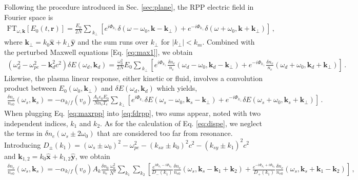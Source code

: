 \documentclass[
 reprint,
 superscriptaddress,
 amsmath,amssymb,
 aps,
]{revtex4-1}
\begin{document}
\begin{widetext}
Following the procedure introduced in Sec. \ref{sec:plane}, the RPP electric field in Fourier space is
\begin{align}
\mathrm{FT}_{\omega,\mathbf{k} }[E_0(t,\mathbf{r}) ]= \frac{E_0}{2N} \sum_{\ k_{\perp} }[ e^{i\Phi_{k_\perp}}\delta(\omega-\omega_0, \mathbf{k}-\mathbf{k}_\perp)    + e^{-i\Phi_{k_\perp}}\delta(\omega+\omega_0, \mathbf{k}+\mathbf{k}_\perp) ]
\, , \label{eq:erppf}
\end{align}
 where $\mathbf{k}_\perp= k_0\hat{\mathbf{x}} +k_\perp \hat{\mathbf{y}}$ and the sum runs over $k_\perp$ for $\vert k_\perp\vert  <k_m$.
 Combined with the perturbed Maxwell equations [Eq. \eqref{eq:max1}], we obtain
 \begin{align}
    (\omega_d^2 - \omega_{pe}^2 -\mathbf{k}_d^2c^2)\delta E(\omega_d,\mathbf{k}_d) = \frac{\omega_0^2}{2N} E_0 \sum_{\ k_{\perp} }   \left[e^{i\Phi_{k_\perp}}\frac{\delta n_e }{n_c}(\omega_d-\omega_0, \mathbf{k}_d-\mathbf{k}_\perp) +e^{-i\Phi_{k_\perp}}\frac{\delta n_e }{n_c}(\omega_d+\omega_0, \mathbf{k}_d+\mathbf{k}_\perp) \right] \, .\label{eq:maxrpp}
\end{align}
Likewise, the plasma linear response, either kinetic or fluid, involves a convolution product between $E_0(\omega_0,\mathbf{k}_\perp)$ and $\delta E(\omega_d,\mathbf{k}_d)$ which yields,
\begin{align}
   \frac{\delta n_e }{n_{e0}}(\omega_s,\mathbf{k}_s) = -\alpha_{k/f}(v_\phi) \frac{A_k\epsilon_0E_0}{Nn_c T_e} \sum_{\ k_{\perp} }     \left[e^{i\Phi_{k_\perp}}\delta E(\omega_s-\omega_0, \mathbf{k}_s-\mathbf{k}_{\perp}) +e^{-i\Phi_{k_\perp}}\delta E(\omega_s+\omega_0, \mathbf{k}_s+\mathbf{k}_{\perp}) \right] \, .\label{eq:fdrpp} 
\end{align}
When plugging Eq. \eqref{eq:maxrpp} into \eqref{eq:fdrpp}, two sums appear, noted with two independent indices, $k_1$ and $k_2$. As for the calculation of Eq. \eqref{eq:dispe}, we neglect the terms in $\delta n_e(\omega_s\pm 2\omega_0)$ that are considered too far from resonance. Introducing $D_\pm(k_{1})= (\omega_s\pm\omega_0)^2 - \omega_{pe}^2 -( k_{sx}\pm k_0) ^2c^2 -( k_{sy}\pm k_{1}) ^2c^2$ and $\mathbf{k}_{1,2}= k_0\hat{\mathbf{x}} +k_{1,2} \hat{\mathbf{y}}$, we obtain
\begin{align}
   \frac{\delta n_e }{n_{e0}}(\omega_s,\mathbf{k}_s) = -\alpha_{k/f}(v_\phi)A_k \frac{\delta n_0}{n_c} \frac{\omega_0^2}{N^2}\sum_{ k_{1} } \sum_{ k_{2} }        \left[ \frac{e^{i\Phi_{k_1}-i\Phi_{k_2}} }{D_-(k_{1})}\frac{\delta n_e }{n_{e0}}(\omega_s,\mathbf{k}_s-\mathbf{k}_{1}+\mathbf{k}_{2}) +\frac{e^{-i\Phi_{k_1}+i\Phi_{k_2}}}{D_+(k_{1})} \frac{\delta n_e }{n_{e0}}(\omega_s,\mathbf{k}_s+\mathbf{k}_{1}-\mathbf{k}_{2}) \right] \, ,\label{eq:fddrpp} 
\end{align}
 \end{widetext}
 
\end{document}
